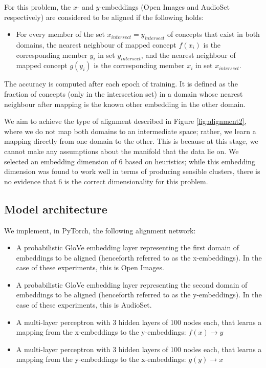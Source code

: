 For this problem, the $x$- and $y$-embeddings (Open Images and AudioSet respectively) are considered to be aligned if the following holds:

\begin{itemize}
    \item For every member of the set $x_{intersect} = y_{intersect}$ of concepts that exist in both domains, the nearest neighbour of mapped concept $f(x_i)$ is the corresponding member $y_i$ in set $y_{intersect}$, and the nearest neighbour of mapped concept $g(y_i)$ is the corresponding member $x_i$ in set $x_{intersect}$. 
\end{itemize}

The accuracy is computed after each epoch of training. It is defined as the fraction of concepts (only in the intersection set) in a domain whose nearest neighbour after mapping is the known other embedding in the other domain. 

We aim to achieve the type of alignment described in Figure \ref{fig:alignment2}, where we do not map both domains to an intermediate space; rather, we learn a mapping directly from one domain to the other. This is because at this stage, we cannot make any assumptions about the manifold that the data lie on. We selected an embedding dimension of 6 based on heuristics; while this embedding dimension was found to work well in terms of producing sensible clusters, there is no evidence that 6 is the correct dimensionality for this problem. 

\subsection{Model architecture}

We implement, in PyTorch, the following alignment network: 

\begin{itemize}
    \item A probabilistic GloVe embedding layer representing the first domain of embeddings to be aligned (henceforth referred to as the x-embeddings). In the case of these experiments, this is Open Images. 
    \item A probabilistic GloVe embedding layer representing the second domain of embeddings to be aligned (henceforth referred to as the y-embeddings). In the case of these experiments, this is AudioSet. 
    \item A multi-layer perceptron with 3 hidden layers of 100 nodes each, that learns a mapping from the x-embeddings to the y-embeddings: $f(x) \rightarrow y$
    \item A multi-layer perceptron with 3 hidden layers of 100 nodes each, that learns a mapping from the y-embeddings to the x-embeddings: $g(y) \rightarrow x$
\end{itemize}


